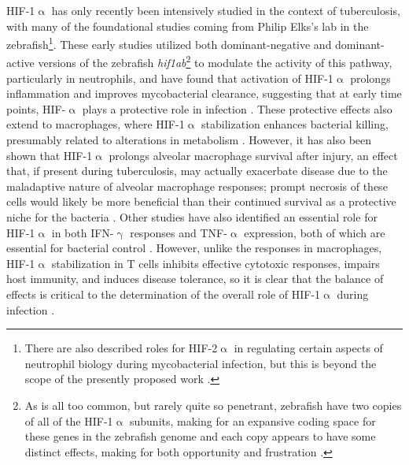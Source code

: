 HIF\hyp{}1$\upalpha$ has only recently been intensively studied in the context of tuberculosis, with many of the foundational studies coming from Philip Elks's lab in the zebrafish\footnote{There are also described roles for HIF\hyp{}2$\upalpha$ in regulating certain aspects of neutrophil biology during mycobacterial infection, but this is beyond the scope of the presently proposed work \citep{Thompson2014, Elks2015}.}. These early studies utilized both dominant\hyp{}negative and dominant\hyp{}active versions of the zebrafish \textit{hif1ab}\footnote{As is all too common, but rarely quite so penetrant, zebrafish have two copies of all of the HIF\hyp{}1$\upalpha$ subunits, making for an expansive coding space for these genes in the zebrafish genome and each copy appears to have some distinct effects, making for both opportunity and frustration \citep{Elks2015}.} to modulate the activity of this pathway, particularly in neutrophils, and have found that activation of HIF\hyp{}1$\upalpha$ prolongs inflammation and improves mycobacterial clearance, suggesting that at early time points, HIF\hyp{}$\upalpha$ plays a protective role in infection \citep{Elks2011, Elks2013, Hammond2020}. These protective effects also extend to macrophages, where HIF\hyp{}1$\upalpha$ stabilization enhances bacterial killing, presumably related to alterations in metabolism \citep{Knight2018, Zenk2021}. However, it has also been shown that HIF\hyp{}1$\upalpha$ prolongs alveolar macrophage survival after injury, an effect that, if present during tuberculosis, may actually exacerbate disease due to the maladaptive nature of alveolar macrophage responses; prompt necrosis of these cells would likely be more beneficial than their continued survival as a protective niche for the bacteria \citep{Woods2022, Leemans2001}. Other studies have also identified an essential role for HIF\hyp{}1$\upalpha$ in both IFN\hyp{}$\upgamma$ responses and TNF\hyp{}$\upalpha$ expression, both of which are essential for bacterial control \citep{Braverman2016, Lewis2019, Flynn1993, Flynn1995}. However, unlike the responses in macrophages, HIF\hyp{}1$\upalpha$ stabilization in T cells inhibits effective cytotoxic responses, impairs host immunity, and induces disease tolerance, so it is clear that the balance of effects is critical to the determination of the overall role of HIF\hyp{}1$\upalpha$ during infection \citep{Liu2022b, Tzelepis2018}.

